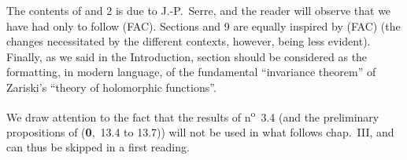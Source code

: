 The contents of \textsection{} and 2 is due to J.-P.~Serre, and the reader will observe that we have had only to follow (FAC).
Sections  and 9 are equally inspired by (FAC) (the changes necessitated by the different contexts, however, being less evident).
Finally, as we said in the Introduction, section  should be considered as the formatting, in modern language, of the fundamental ``invariance theorem'' of Zariski's ``theory of holomorphic functions''.

We draw attention to the fact that the results of n\textsuperscript{o}~3.4 (and the preliminary propositions of (\textbf{0},~13.4 to 13.7)) will not be used in what follows chap.~III, and can thus be skipped in a first reading.

\bigskip














